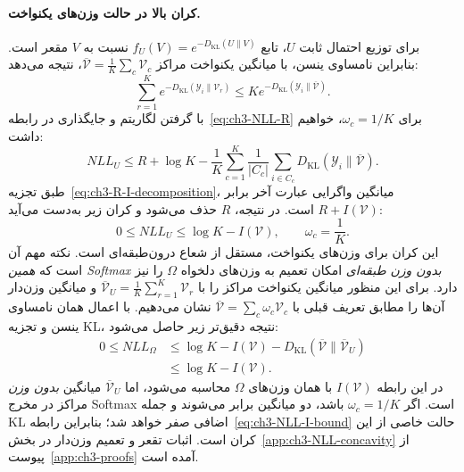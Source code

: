 \paragraph{کران بالا در حالت وزن‌های یکنواخت.}
برای توزیع احتمال ثابت $U$، تابع $f_U(V)=e^{-D_{\mathrm{KL}}(U\|V)}$ نسبت به $V$ مقعر است. بنابراین نامساوی ینسن، با میانگین یکنواخت مراکز $\overline{\mathcal V}=\frac1K\sum_c\mathcal V_c$، نتیجه می‌دهد:
\begin{equation}\label{eq:ch3-NLL-Jensen}
\sum_{r=1}^{K}e^{-D_{\mathrm{KL}}(\mathscr Y_i\|\mathcal V_r)}
\le K e^{-D_{\mathrm{KL}}(\mathscr Y_i\|\overline{\mathcal V})}.
\end{equation}
با گرفتن لگاریتم و جایگذاری در رابطه~\eqref{eq:ch3-NLL-R} برای $\omega_c=1/K$، خواهیم داشت:
\begin{equation}\label{eq:ch3-NLL-pre-I}
NLL_U\le R+\log K-\frac1K\sum_{c=1}^{K}
\frac1{|C_c|}\sum_{i\in C_c}
D_{\mathrm{KL}}(\mathscr Y_i\|\overline{\mathcal V}).
\end{equation}
طبق تجزیه~\eqref{eq:ch3-R-I-decomposition}، میانگین واگرایی عبارت آخر برابر $R+I(\mathcal V)$ است. در نتیجه، $R$ حذف می‌شود و کران زیر به‌دست می‌آید:
\begin{equation}\label{eq:ch3-NLL-I-bound}
\boxed{0\le NLL_U\le\log K-I(\mathcal V),
\qquad \omega_c=\frac1K.}
\end{equation}
این کران برای وزن‌های یکنواخت، مستقل از شعاع درون‌طبقه‌ای است. نکته مهم آن است که \emph{همین Softmax بدون وزن طبقه‌ای} امکان تعمیم به وزن‌های دلخواه $\Omega$ را نیز دارد. برای این منظور میانگین یکنواخت مراکز را با $\overline{\mathcal V}_U=\frac1K\sum_{r=1}^{K}\mathcal V_r$ و میانگین وزن‌دار آن‌ها را مطابق تعریف قبلی با $\overline{\mathcal V}=\sum_c\omega_c\mathcal V_c$ نشان می‌دهیم. با اعمال همان نامساوی ینسن و تجزیه KL، نتیجه دقیق‌تر زیر حاصل می‌شود:
\begin{equation}\label{eq:ch3-NLL-weighted-I-bound}
\boxed{
\begin{aligned}
0\le NLL_\Omega
&\le\log K-I(\mathcal V)
-D_{\mathrm{KL}}(\overline{\mathcal V}\|\overline{\mathcal V}_U)\\
&\le\log K-I(\mathcal V).
\end{aligned}}
\end{equation}
در این رابطه $I(\mathcal V)$ با همان وزن‌های $\Omega$ محاسبه می‌شود، اما $\overline{\mathcal V}_U$ میانگین \emph{بدون وزن} مراکز در مخرج Softmax است. اگر $\omega_c=1/K$ باشد، دو میانگین برابر می‌شوند و جمله KL اضافی صفر خواهد شد؛ بنابراین رابطه~\eqref{eq:ch3-NLL-I-bound} حالت خاصی از این کران است. اثبات تقعر و تعمیم وزن‌دار در بخش~\ref{app:ch3-NLL-concavity} از پیوست~\ref{app:ch3-proofs} آمده است.


